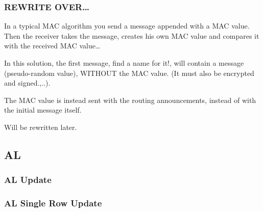 \subsubsection*{REWRITE OVER\ldots}
In a typical MAC algorithm you send a message appended with a MAC value. Then
the receiver takes the message, creates his own MAC value and compares it with
the received MAC value\ldots 

In this solution, the first message, find a name for it!, will contain a message
(pseudo-random value), WITHOUT the MAC value. (It must also be encrypted and
signed.,..). 

The MAC value is instead sent with the routing announcements, instead of with
the initial message itself.

Will be rewritten later.

\subsection{\acf{AL}}

\subsubsection*{\acf{AL} Update}

\subsubsection*{\acf{AL} Single Row Update}